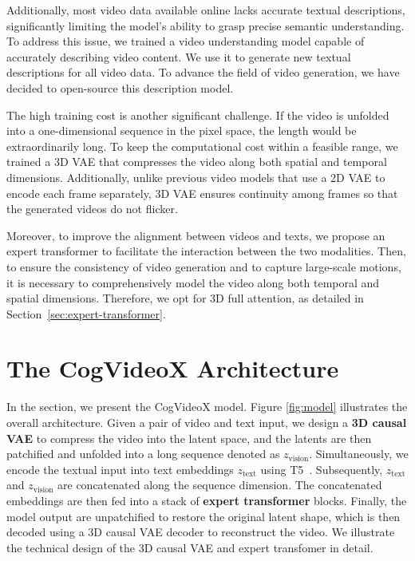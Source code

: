 \documentclass{article} \usepackage{iclr2024_conference,times}
\newcommand{\model}{CogVideoX\xspace}
\begin{document}
{Additionally, most video data available online lacks accurate textual descriptions, significantly limiting the model's ability to grasp precise semantic understanding. To address this issue, we trained a video understanding model capable of accurately describing video content. We use it to generate new textual descriptions for all video data. 
To advance the field of video generation, we have decided to open-source this description model.

The high training cost is another significant challenge. If the video is unfolded into a one-dimensional sequence in the pixel space, the length would be extraordinarily long. To keep the computational cost within a feasible range, we trained a 3D VAE that compresses the video along both spatial and temporal dimensions. Additionally,  unlike previous video models that use a 2D VAE to encode each frame separately, 3D VAE ensures continuity among frames so that the generated videos do not flicker. 

Moreover, to improve the alignment between videos and texts, we propose an expert transformer to facilitate the interaction between the two modalities. Then, to ensure the consistency of video generation and to capture large-scale motions, it is necessary to comprehensively model the video along both temporal and spatial dimensions. Therefore, we opt for 3D full attention, as detailed in Section~\ref{sec:expert-transformer}.



} \section{The \model Architecture}\label{sec:model}


In the section, we present the \model model. 
Figure \ref{fig:model} illustrates the overall architecture. 
Given a pair of video and text input,  we design a \textbf{3D causal VAE} to compress the video into the latent space, and the latents are then patchified and unfolded into a long sequence denoted as $z_{\text{vision}}$. 
Simultaneously, we encode the textual input into text embeddings $z_{\text{text}}$ using T5~\cite{raffel2020exploring}. 
Subsequently, $z_{\text{text}}$ and $z_{\text{vision}}$ are concatenated along the sequence dimension. 
The concatenated embeddings are then fed into a stack of \textbf{expert transformer} blocks.
Finally, the model output are unpatchified to restore the original latent shape, which is then decoded using a 3D causal VAE decoder to reconstruct the video. 
We illustrate the technical design of the 3D causal VAE and expert transfomer in detail.
\end{document}

